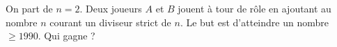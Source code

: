 On part de $n = 2$. Deux joueurs $A$ et $B$ jouent à tour de rôle en ajoutant au nombre $n$ courant un diviseur strict de $n$. Le but est d'atteindre un nombre $\geq 1990$. Qui gagne ?
